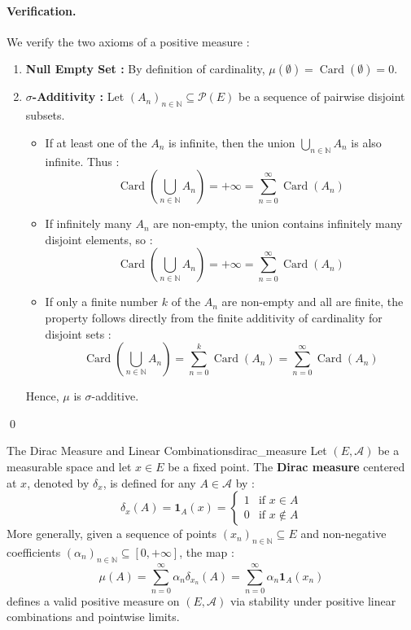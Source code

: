 \paragraph{Verification.}
We verify the two axioms of a positive measure :
\begin{enumerate}[label=(\roman*)]
    \item \textbf{Null Empty Set :} By definition of cardinality, $\mu(\emptyset) = \operatorname{Card}(\emptyset) = 0$.
    \item \textbf{$\sigma$-Additivity :} Let $(A_n)_{n \in \mathbb{N}} \subseteq \mathcal{P}(E)$ be a sequence of pairwise disjoint subsets.
    \begin{itemize}
        \item If at least one of the $A_n$ is infinite, then the union $\bigcup_{n \in \mathbb{N}} A_n$ is also infinite. Thus :
        \[
            \operatorname{Card}\left( \bigcup_{n \in \mathbb{N}} A_n \right) = +\infty = \sum_{n=0}^\infty \operatorname{Card}(A_n)
        \]
        \item If infinitely many $A_n$ are non-empty, the union contains infinitely many disjoint elements, so :
        \[
            \operatorname{Card}\left( \bigcup_{n \in \mathbb{N}} A_n \right) = +\infty = \sum_{n=0}^\infty \operatorname{Card}(A_n)
        \]
        \item If only a finite number $k$ of the $A_n$ are non-empty and all are finite, the property follows directly from the finite additivity of cardinality for disjoint sets :
        \[
            \operatorname{Card}\left( \bigcup_{n \in \mathbb{N}} A_n \right) = \sum_{n=0}^k \operatorname{Card}(A_n) = \sum_{n=0}^\infty \operatorname{Card}(A_n)
        \]
    \end{itemize}
    Hence, $\mu$ is $\sigma$-additive.
\end{enumerate}
\qed

\vspace{1.2em}


\begin{example}{The Dirac Measure and Linear Combinations}{dirac_measure}
Let $(E, \mathcal{A})$ be a measurable space and let $x \in E$ be a fixed point. The \textbf{Dirac measure} centered at $x$, denoted by $\delta_x$, is defined for any $A \in \mathcal{A}$ by :
\[
    \delta_x(A) = \mathbf{1}_A(x) = 
    \begin{cases}
        1 & \text{if } x \in A \\
        0 & \text{if } x \notin A
    \end{cases}
\]
More generally, given a sequence of points $(x_n)_{n \in \mathbb{N}} \subseteq E$ and non-negative coefficients $(\alpha_n)_{n \in \mathbb{N}} \subseteq [0, +\infty]$, the map :
\[
    \mu(A) = \sum_{n=0}^\infty \alpha_n \delta_{x_n}(A) = \sum_{n=0}^\infty \alpha_n \mathbf{1}_A(x_n)
\]
defines a valid positive measure on $(E, \mathcal{A})$ via stability under positive linear combinations and pointwise limits.
\end{example}

